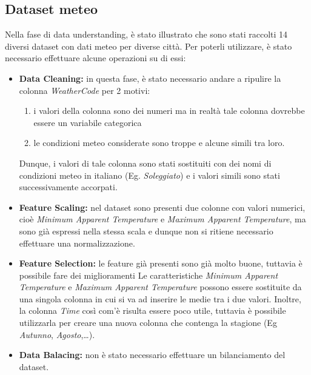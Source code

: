 \documentclass[a4paper, 11pt, oneside]{report}
\begin{document}
                \subsection{Dataset meteo}
                Nella fase di data understanding, è stato illustrato che sono stati raccolti 14 diversi dataset con dati meteo per diverse città.
                Per poterli utilizzare, è stato necessario effettuare alcune operazioni su di essi:\\
                \begin{itemize}
                    \item \textbf{Data Cleaning:} in questa fase, è stato necessario andare a ripulire la colonna \emph{WeatherCode} per 2 motivi:
                        \begin{enumerate}
                            \item i valori della colonna sono dei numeri ma in realtà tale colonna dovrebbe essere un variabile categorica
                            \item le condizioni meteo considerate sono troppe e alcune simili tra loro.
                        \end{enumerate}
                    Dunque, i valori di tale colonna sono stati sostituiti con dei nomi di condizioni meteo in italiano (Eg.
                    \emph{Soleggiato}) e i valori simili sono stati successivamente accorpati.
                    \item \textbf{Feature Scaling:} nel dataset sono presenti due colonne con valori numerici, cioè
                    \emph{Minimum Apparent Temperature} e \emph{Maximum Apparent Temperature},
                    ma sono già espressi nella stessa scala e dunque non si ritiene necessario effettuare una normalizzazione.
                    \item \textbf{Feature Selection:} le feature già presenti sono già molto buone, tuttavia è possibile fare dei miglioramenti
                    Le caratteristiche \emph{Minimum Apparent Temperature} e \emph{Maximum Apparent Temperature}
                    possono essere sostituite da una singola colonna in cui si va ad inserire le medie tra i due valori.
                    Inoltre, la colonna \emph{Time} così com'è risulta essere poco utile, tuttavia è possibile utilizzarla per
                    creare una nuova colonna che contenga la stagione (Eg \emph{Autunno}, \emph{Agosto},\ldots).
                    \item \textbf{Data Balacing:} non è stato necessario effettuare un bilanciamento del dataset.
                \end{itemize}
\end{document}
